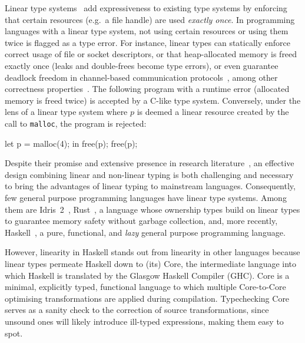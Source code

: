 \documentclass[acmsmall,review,anonymous,screen]{acmart}
\begin{document}
Linear type systems~\cite{cite:linear-logic,cite:barberdill} add expressiveness
to existing type systems by enforcing that certain resources (e.g.~a
file handle) are used \emph{exactly once}.
%
In programming languages with a linear type system, not using certain resources
or using them twice is flagged as a type error. For instance, linear types can
statically enforce correct usage of file or socket descriptors, or
that heap-allocated memory is freed exactly once (leaks and double-frees become
type errors), or even guarantee deadlock freedom in channel-based communication
protocols~\cite{10.1007/978-3-642-15375-4_16},
among other correctness properties~\cite{10.1145/3373718.3394765,10.1145/3527313,cite:linearhaskell}.
%
The following program with a runtime error (allocated memory is freed twice) is
accepted by a C-like type system. Conversely, under the lens of a linear type
system where $p$ is deemed a linear resource created by the call to
\texttt{malloc}, the program is rejected:
\begin{code}
let p = malloc(4); in free(p); free(p);
\end{code}

Despite their promise and extensive presence in research
literature~\cite{Wadler1990LinearTC,CERVESATO2000133,10.1093/logcom/2.3.297},
an effective design combining linear and non-linear typing is both
challenging and necessary to bring the advantages of linear typing to
mainstream languages.
%
Consequently, few general purpose programming languages have linear
type systems. Among them are Idris~2~\cite{brady:LIPIcs.ECOOP.2021.9},
Rust~\cite{10.1145/2692956.2663188}, a language whose
ownership types build on linear types to guarantee memory safety
without garbage collection, and, more recently,
Haskell~\cite{cite:linearhaskell}, a pure, functional, and
\emph{lazy} general purpose programming language.
%
%

However, linearity in Haskell stands out from linearity in other
languages because linear types permeate Haskell down to (its) Core, the
intermediate language into which Haskell is translated by the Glasgow Haskell Compiler (GHC).
%
Core is a minimal, explicitly typed, functional language to which multiple
Core-to-Core optimising transformations are applied during compilation.
%
Typechecking Core serves as a sanity check to the correction of source
transformations, since unsound ones will likely introduce ill-typed
expressions, making them easy to spot.
%
%
\end{document}
